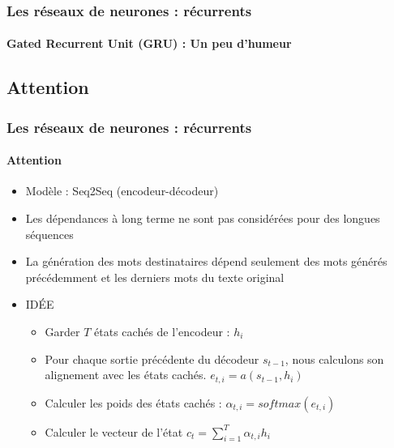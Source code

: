 \documentclass[xcolor=table]{beamer}
\begin{document}
\begin{frame}
	\frametitle{Les réseaux de neurones : récurrents}
	\framesubtitle{Gated Recurrent Unit (GRU) : Un peu d'humeur}
	
	\begin{center}
	\end{center}
	
\end{frame}


\subsection{Attention}

\begin{frame}
	\frametitle{Les réseaux de neurones : récurrents}
	\framesubtitle{Attention}
	
	\begin{itemize}
		\item Modèle : Seq2Seq (encodeur-décodeur)
		\item Les dépendances à long terme ne sont pas considérées pour des longues séquences
		\item La génération des mots destinataires dépend seulement des mots générés précédemment et les derniers mots du texte original
		\item IDÉE 
		\begin{itemize}
			\item Garder $T$ états cachés de l'encodeur : $h_i$
			\item Pour chaque sortie précédente du décodeur $s_{t-1}$, nous calculons son alignement avec les états cachés.
			$ e_{t, i} = a(s_{t-1}, h_i) $
			\item Calculer les poids des états cachés : $\alpha_{t, i} = softmax(e_{t, i})$
			\item Calculer le vecteur de l'état $c_t = \sum_{i=1}^{T} \alpha_{t, i} h_i$
		\end{itemize}
	\end{itemize}
	
\end{frame}
\end{document}
